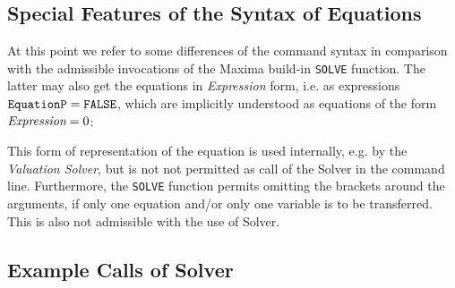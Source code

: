 \subsection{Special Features of the Syntax of Equations}

At this point we refer to some differences of the command syntax in  comparison with the admissible invocations of the Maxima build-in \verb+SOLVE+ function. The latter may also get the equations in {\em Expression} form, i.e. as expressions  $\verb#EquationP# = \verb#FALSE#$, which are implicitly understood  as equations of the form $\mbox{\em Expression} = 0$:
This form of representation of the equation  is used internally, e.g. by the {\em 
Valuation Solver}, but is not not permitted as call of the Solver in the command line. Furthermore, the \verb+SOLVE+ function permits  omitting the brackets around the arguments, if only one equation and/or only one variable is to be transferred. This is  also not admissible with the use of Solver.

\subsection{Example Calls of Solver}

